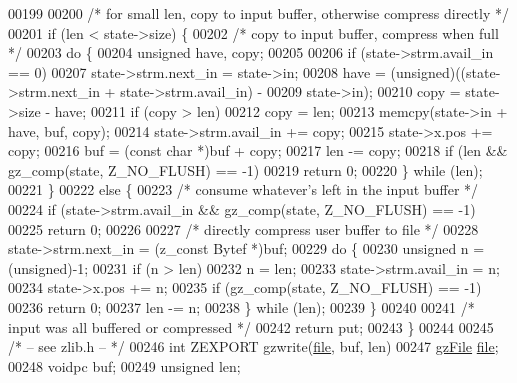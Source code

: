 \begin{DoxyCode}
00199 
00200     \textcolor{comment}{/* for small len, copy to input buffer, otherwise compress directly */}
00201     \textcolor{keywordflow}{if} (len < state->size) \{
00202         \textcolor{comment}{/* copy to input buffer, compress when full */}
00203         \textcolor{keywordflow}{do} \{
00204             \textcolor{keywordtype}{unsigned} have, copy;
00205 
00206             \textcolor{keywordflow}{if} (state->strm.avail\_in == 0)
00207                 state->strm.next\_in = state->in;
00208             have = (unsigned)((state->strm.next\_in + state->strm.avail\_in) -
00209                               state->in);
00210             copy = state->size - have;
00211             \textcolor{keywordflow}{if} (copy > len)
00212                 copy = len;
00213             memcpy(state->in + have, buf, copy);
00214             state->strm.avail\_in += copy;
00215             state->x.pos += copy;
00216             buf = (\textcolor{keyword}{const} \textcolor{keywordtype}{char} *)buf + copy;
00217             len -= copy;
00218             \textcolor{keywordflow}{if} (len && gz\_comp(state, Z\_NO\_FLUSH) == -1)
00219                 \textcolor{keywordflow}{return} 0;
00220         \} \textcolor{keywordflow}{while} (len);
00221     \}
00222     \textcolor{keywordflow}{else} \{
00223         \textcolor{comment}{/* consume whatever's left in the input buffer */}
00224         \textcolor{keywordflow}{if} (state->strm.avail\_in && gz\_comp(state, Z\_NO\_FLUSH) == -1)
00225             \textcolor{keywordflow}{return} 0;
00226 
00227         \textcolor{comment}{/* directly compress user buffer to file */}
00228         state->strm.next\_in = (z\_const Bytef *)buf;
00229         \textcolor{keywordflow}{do} \{
00230             \textcolor{keywordtype}{unsigned} n = (unsigned)-1;
00231             \textcolor{keywordflow}{if} (n > len)
00232                 n = len;
00233             state->strm.avail\_in = n;
00234             state->x.pos += n;
00235             \textcolor{keywordflow}{if} (gz\_comp(state, Z\_NO\_FLUSH) == -1)
00236                 \textcolor{keywordflow}{return} 0;
00237             len -= n;
00238         \} \textcolor{keywordflow}{while} (len);
00239     \}
00240 
00241     \textcolor{comment}{/* input was all buffered or compressed */}
00242     \textcolor{keywordflow}{return} put;
00243 \}
00244 
00245 \textcolor{comment}{/* -- see zlib.h -- */}
00246 \textcolor{keywordtype}{int} ZEXPORT gzwrite(\hyperlink{structfile}{file}, buf, len)
00247     \hyperlink{structgz_file__s}{gzFile} \hyperlink{structfile}{file};
00248     voidpc buf;
00249     \textcolor{keywordtype}{unsigned} len;

\end{DoxyCode}
